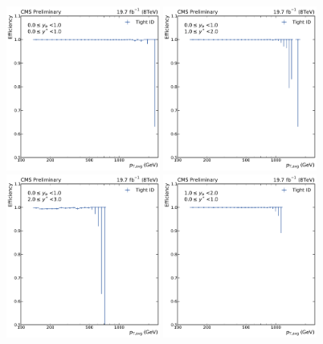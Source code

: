 \begin{figure}[htbp]
    \centering
    \includegraphics[width=0.45\textwidth]{figures/measurement/jetideff_yb0ys0.pdf}\hfill
    \includegraphics[width=0.45\textwidth]{figures/measurement/jetideff_yb0ys1.pdf}
    \includegraphics[width=0.45\textwidth]{figures/measurement/jetideff_yb0ys2.pdf}\hfill
    \includegraphics[width=0.45\textwidth]{figures/measurement/jetideff_yb1ys0.pdf}

\end{figure}
